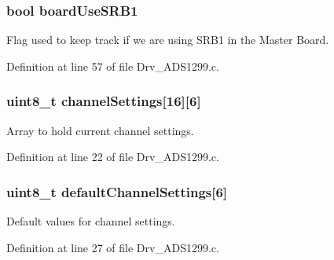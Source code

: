 \subsubsection[{\texorpdfstring{board\+Use\+S\+R\+B1}{boardUseSRB1}}]{\setlength{\rightskip}{0pt plus 5cm}bool board\+Use\+S\+R\+B1}\hypertarget{group__ADS1299__Library_ga1e02fad8a694c8bbfeba493b8be214e4}{}\label{group__ADS1299__Library_ga1e02fad8a694c8bbfeba493b8be214e4}


Flag used to keep track if we are using S\+R\+B1 in the Master Board. 



Definition at line 57 of file Drv\+\_\+\+A\+D\+S1299.\+c.

\subsubsection[{\texorpdfstring{channel\+Settings}{channelSettings}}]{\setlength{\rightskip}{0pt plus 5cm}uint8\+\_\+t channel\+Settings\mbox{[}16\mbox{]}\mbox{[}6\mbox{]}}\hypertarget{group__ADS1299__Library_ga301925f8d0be3a235549a1d8a2775909}{}\label{group__ADS1299__Library_ga301925f8d0be3a235549a1d8a2775909}


Array to hold current channel settings. 



Definition at line 22 of file Drv\+\_\+\+A\+D\+S1299.\+c.

\subsubsection[{\texorpdfstring{default\+Channel\+Settings}{defaultChannelSettings}}]{\setlength{\rightskip}{0pt plus 5cm}uint8\+\_\+t default\+Channel\+Settings\mbox{[}6\mbox{]}}\hypertarget{group__ADS1299__Library_ga0ec603fb6c5e40febc9a5139ef12969b}{}\label{group__ADS1299__Library_ga0ec603fb6c5e40febc9a5139ef12969b}


Default values for channel settings. 



Definition at line 27 of file Drv\+\_\+\+A\+D\+S1299.\+c.

